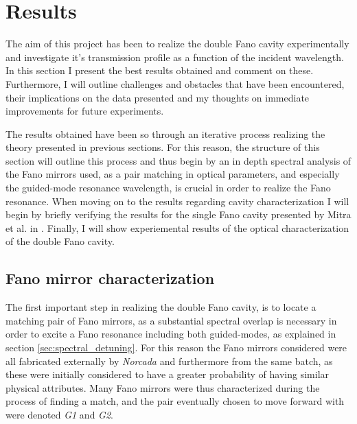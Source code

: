 \section{Results}

The aim of this project has been to realize the double Fano cavity experimentally and investigate it's transmission profile as a function of the incident wavelength. In this section I present the best results obtained and comment on these. Furthermore, I will outline challenges and obstacles that have been encountered, their implications on the data presented and my thoughts on immediate improvements for future experiments. 

The results obtained have been so through an iterative process realizing the theory presented in previous sections. For this reason, the structure of this section will outline this process and thus begin by an in depth spectral analysis of the Fano mirrors used, as a pair matching in optical parameters, and especially the guided-mode resonance wavelength, is crucial in order to realize the Fano resonance. When moving on to the results regarding cavity characterization I will begin by briefly verifying the results for the single Fano cavity presented by Mitra et al. in \cite{Mitra}. Finally, I will show experiemental results of the optical characterization of the double Fano cavity. 

\subsection{Fano mirror characterization}\label{sec:results_fano_mirror_characterization}

The first important step in realizing the double Fano cavity, is to locate a matching pair of Fano mirrors, as a substantial spectral overlap is necessary in order to excite a Fano resonance including both guided-modes, as explained in section \ref{sec:spectral_detuning}. For this reason the Fano mirrors considered were all fabricated externally by \emph{Norcada} and furthermore from the same batch, as these were initially considered to have a greater probability of having similar physical attributes. Many Fano mirrors were thus characterized during the process of finding a match, and the pair eventually chosen to move forward with were denoted \emph{G1} and \emph{G2}. 


